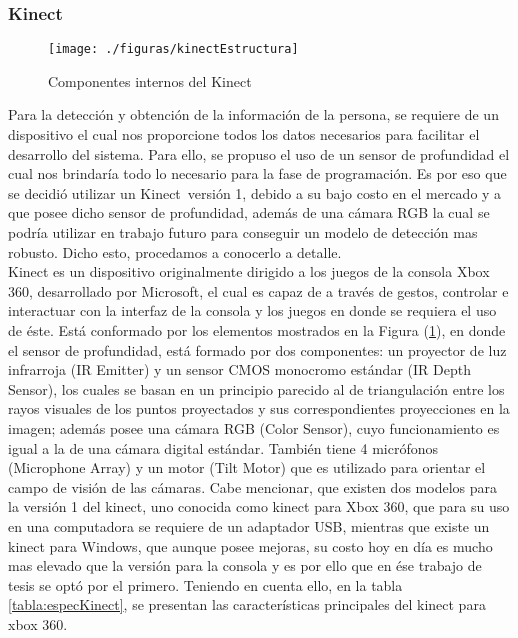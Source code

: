 \documentclass[a4paper,openright,12pt]{report}
\begin{document}
\subsubsection{Kinect}
\begin{figure}[thb]
	\centering
	\texttt{[image: ./figuras/kinectEstructura]}
	\caption{Componentes internos del Kinect} \label{fig:kinectEstructura}
\end{figure}
Para la detección y obtención de la información de la persona, se requiere de un dispositivo el cual nos proporcione todos los datos necesarios para facilitar el desarrollo del sistema. Para ello, se propuso el uso de un sensor de profundidad el cual nos brindaría todo lo necesario para la fase de programación. Es por eso que se decidió utilizar un Kinect\textregistered\ versión 1, debido a su bajo costo en el mercado y a que posee dicho sensor de profundidad, además de una cámara RGB la cual se podría utilizar en trabajo futuro para conseguir un modelo de detección mas robusto. Dicho esto, procedamos a conocerlo a detalle.\\
Kinect es un dispositivo originalmente dirigido a los juegos de la consola Xbox 360\textregistered, desarrollado por Microsoft, el cual es capaz de a través de gestos, controlar e interactuar con la interfaz de la consola y los juegos en donde se requiera el uso de éste. Está conformado por los elementos mostrados en la Figura (\ref{fig:kinectEstructura}), en donde el sensor de profundidad, está formado por dos componentes: un proyector de luz infrarroja (IR Emitter) y un sensor CMOS monocromo estándar (IR Depth Sensor), los cuales se basan en un principio parecido al de triangulación entre los rayos visuales de los puntos proyectados y sus correspondientes proyecciones en la imagen; además posee una cámara RGB (Color Sensor), cuyo funcionamiento es igual a la de una cámara digital estándar. También tiene 4 micrófonos (Microphone Array) y un motor (Tilt Motor) que es utilizado para orientar el campo de visión de las cámaras. Cabe mencionar, que existen dos modelos para la versión 1 del kinect, uno conocida como kinect para Xbox 360, que para su uso en una computadora se requiere de un adaptador USB, mientras que existe un kinect para Windows, que aunque posee mejoras, su costo hoy en día es mucho mas elevado que la versión para la consola y es por ello que en ése trabajo de tesis se optó por el primero. Teniendo en cuenta ello, en la tabla \ref{tabla:especKinect}, se presentan las características principales del kinect para xbox 360.\\
\end{document}
